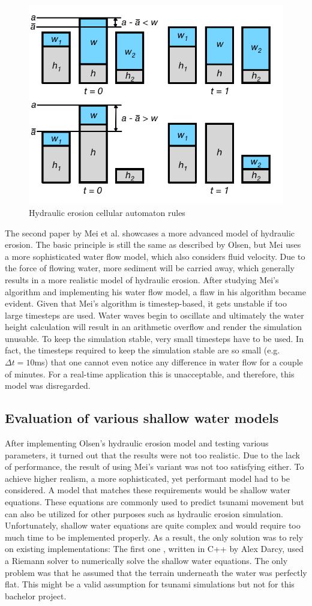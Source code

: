 \documentclass[11pt,a4paper,twoside,openright]{report}
\begin{document}
\begin{figure}[H]
\centering
\includegraphics[width=0.5\linewidth]{hydraulicerosion.png}
\caption{Hydraulic erosion cellular automaton rules}\label{fig:hydrolicerosion}
\end{figure}

\noindent The second paper \cite{mei:inria-00402079} by Mei et al. showcases a more advanced model of hydraulic erosion. The basic principle is still the same as described by Olsen, but Mei uses a more sophisticated water flow model, which also considers fluid velocity. Due to the force of flowing water, more sediment will be carried away, which generally results in a more realistic model of hydraulic erosion. After studying Mei's algorithm and implementing his water flow model, a flaw in his algorithm became evident. Given that Mei's algorithm is timestep-based, it gets unstable if too large timesteps are used. Water waves begin to oscillate and ultimately the water height calculation will result in an arithmetic overflow and render the simulation unusable. To keep the simulation stable, very small timesteps have to be used. In fact, the timesteps required to keep the simulation stable are so small (e.g. $\Delta t = 10$ms) that one cannot even notice any difference in water flow for a couple of minutes. For a real-time application this is unacceptable, and therefore, this model was disregarded.

\subsection{Evaluation of various shallow water models}
After implementing Olsen's hydraulic erosion model and testing various parameters, it turned out that the results were not too realistic. Due to the lack of performance, the result of using Mei's variant was not too satisfying either. To achieve higher realism, a more sophisticated, yet performant model had to be considered. A model that matches these requirements would be shallow water equations. These equations are commonly used to predict tsunami movement but can also be utilized for other purposes such as hydraulic erosion simulation. Unfortunately, shallow water equations are quite complex and would require too much time to be implemented properly. As a result, the only solution was to rely on existing implementations: The first one \cite{Darcy}, written in C++ by Alex Darcy, used a Riemann solver to numerically solve the shallow water equations. The only problem was that he assumed that the terrain underneath the water was perfectly flat. This might be a valid assumption for tsunami simulations but not for this bachelor project.
\end{document}
